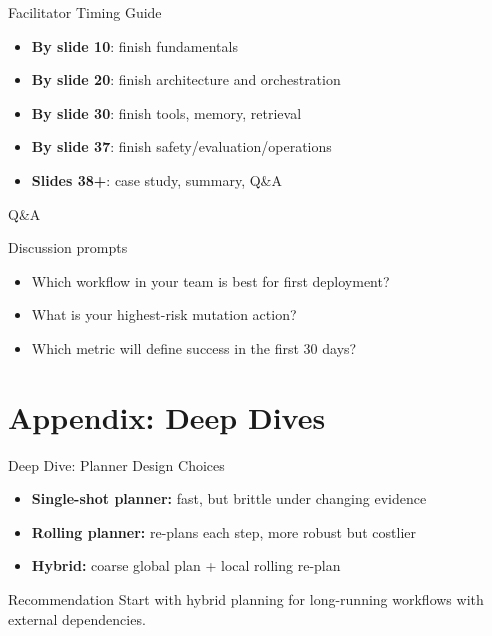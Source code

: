 \documentclass[aspectratio=169]{beamer}
\begin{document}
\begin{frame}{Facilitator Timing Guide}
  \begin{itemize}
    \item \textbf{By slide 10}: finish fundamentals
    \item \textbf{By slide 20}: finish architecture and orchestration
    \item \textbf{By slide 30}: finish tools, memory, retrieval
    \item \textbf{By slide 37}: finish safety/evaluation/operations
    \item \textbf{Slides 38+}: case study, summary, Q\&A
  \end{itemize}
\end{frame}

\begin{frame}{Q\&A}
  \begin{block}{Discussion prompts}
    \begin{itemize}
      \item Which workflow in your team is best for first deployment?
      \item What is your highest-risk mutation action?
      \item Which metric will define success in the first 30 days?
    \end{itemize}
  \end{block}
\end{frame}

\contactslide

\appendix
\section{Appendix: Deep Dives}

\begin{frame}{Deep Dive: Planner Design Choices}
  \begin{itemize}
    \item \textbf{Single-shot planner:} fast, but brittle under changing evidence
    \item \textbf{Rolling planner:} re-plans each step, more robust but costlier
    \item \textbf{Hybrid:} coarse global plan + local rolling re-plan
  \end{itemize}

  \vspace{0.4em}
  \begin{alertbox}{Recommendation}
    Start with hybrid planning for long-running workflows with external dependencies.
  \end{alertbox}
\end{frame}
\end{document}
